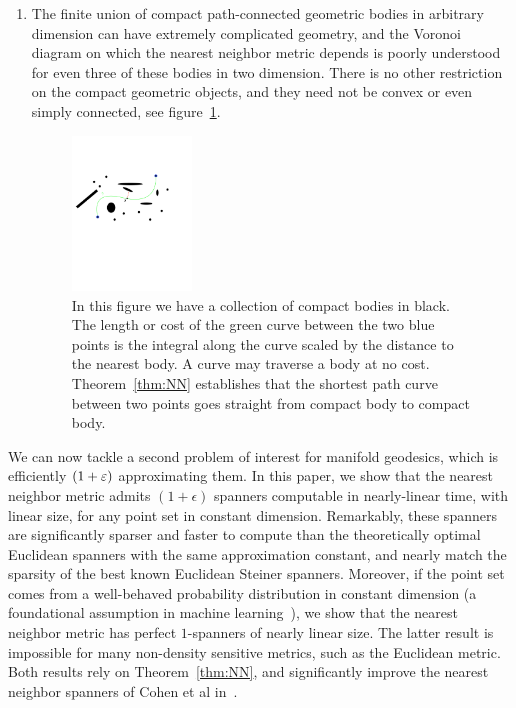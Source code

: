 \begin{enumerate}
 \item The finite union of compact path-connected geometric bodies in arbitrary
 dimension can have extremely complicated geometry, and the Voronoi diagram
on which the nearest neighbor metric depends is poorly understood for even
three of these bodies in two dimension.  There is no other restriction on
the compact geometric objects, and they need not be convex or even simply
connected, see figure~\ref{fig:example1}.
\begin{figure}[htbp]
  \centering
    \includegraphics[width=0.3\textwidth]{Figures/example1.pdf}
    \caption{In this figure we have a collection of compact bodies in black.
      The length or cost of the green curve between the two blue points
      is the integral along the curve scaled by the distance to the nearest body.
    A curve may traverse a body at  no cost. Theorem~\ref{thm:NN}
establishes that the shortest path curve between two points goes straight
from compact body to compact body.}
  \label{fig:example1}
\end{figure}
\end{enumerate}

We can now tackle a second problem of interest for manifold geodesics,
which is efficiently $(1+\varepsilon)$ approximating them. In this paper, we show
that the nearest neighbor metric admits $(1+\epsilon)$ spanners computable
in nearly-linear time, with linear size, for any point set in constant
dimension. Remarkably, these spanners are significantly sparser and faster
to compute than the theoretically optimal Euclidean spanners with the same
approximation constant, and nearly match the sparsity of the best known
Euclidean Steiner spanners. Moreover, if the point set comes from a
well-behaved probability distribution in constant dimension (a foundational
assumption in machine learning~\cite{hwang2016}), we show that the nearest neighbor
metric has perfect $1$-spanners of nearly linear size. The latter result is
impossible for many non-density sensitive metrics, such as the Euclidean
metric. Both results rely on Theorem~\ref{thm:NN}, and significantly
improve the nearest neighbor spanners of Cohen et al in~\cite{cohen15approximating}.

